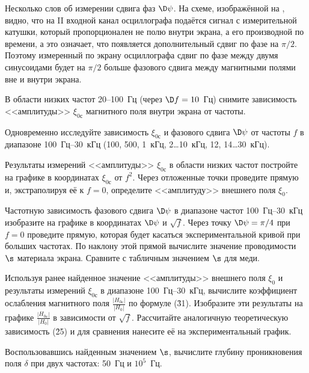 Несколько слов об измерении сдвига фаз $\D\psi$. На схеме, изображённой на , видно, что на II входной канал
осциллографа подаётся сигнал с измерительной катушки, который пропорционален не полю внутри экрана, а его производной по
времени, а это означает, что появляется дополнительный сдвиг по фазе на $\pi/2$. Поэтому измеренный по экрану
осциллографа сдвиг по фазе между двумя синусоидами будет на $\pi/2$ больше фазового сдвига между магнитными полями вне и
внутри экрана.

\zad

\n В области низких частот 20--100~Гц (через $\D f=10$~Гц) снимите зависимость <<амплитуды>> $\xi_{0с}$ магнитного поля
внутри экрана от частоты.

\n Одновременно исследуйте зависимость $\xi_{0с}$ и фазового сдвига $\D\psi$ от частоты $f$ в диапазоне 100~Гц--30~кГц
(100, 500, 1~кГц, 2\dots10~кГц, 12, 14\dots 30~кГц).

\resetnum

\n Результаты измерений <<амплитуды>> $\xi_{0с}$ в области низких частот постройте на графике в координатах $\xi_{0с}$
от $f^2$. Через отложенные точки проведите прямую и, экстраполируя её к $f=0$, определите <<амплитуду>> внешнего поля
$\xi_0$.

\n Частотную зависимость фазового сдвига $\D\psi$ в диапазоне частот 100~Гц--30~кГц изобразите на графике в координатах
$\D\psi$ и $\sqrt{f}$. Через точку $\D\psi=\pi/4$ при $f=0$ проведите прямую, которая будет касаться экспериментальной
кривой при больших частотах. По наклону этой прямой вычислите значение проводимости $\s$ материала экрана. Сравните с
табличным значением $\s$ для меди.

\n Используя ранее найденное значение <<амплитуды>> внешнего поля $\xi_0$ и результаты измерений $\xi_{0с}$ в диапазоне
100~Гц--30~кГц, вычислите коэффициент ослабления магнитного поля $\frac{|H_{0с}|}{|H_0|}$ по формуле (\r{31}). Изобразите
эти результаты на графике $\frac{|H_{0с}|}{|H_0|}$ в зависимости от $\sqrt{f}$. Рассчитайте аналогичную теоретическую
зависимость (\r{25}) и для сравнения нанесите её на экспериментальный график.

\n Воспользовавшись найденным значением $\s$, вычислите глубину проникновения поля $\delta$ при двух частотах: 50~Гц и
$10^5$~Гц.

